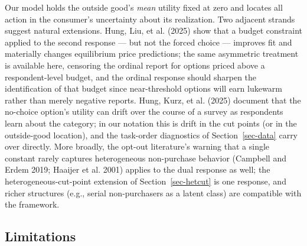 \documentclass[
  letterpaper,
  DIV=11,
  numbers=noendperiod]{scrartcl}
\theoremstyle{plain}
\theoremstyle{plain}
\theoremstyle{remark}
\begin{document}
Our model holds the outside good's \emph{mean} utility fixed at zero and
locates all action in the consumer's uncertainty about its realization.
Two adjacent strands suggest natural extensions. Hung, Liu, et al.
(2025) show that a budget constraint applied to the second response ---
but not the forced choice --- improves fit and materially changes
equilibrium price predictions; the same asymmetric treatment is
available here, censoring the ordinal report for options priced above a
respondent-level budget, and the ordinal response should sharpen the
identification of that budget since near-threshold options will earn
lukewarm rather than merely negative reports. Hung, Kurz, et al. (2025)
document that the no-choice option's utility can drift over the course
of a survey as respondents learn about the category; in our notation
this is drift in the cut points (or in the outside-good location), and
the task-order diagnostics of Section~\ref{sec-data} carry over
directly. More broadly, the opt-out literature's warning that a single
constant rarely captures heterogeneous non-purchase behavior (Campbell
and Erdem 2019; Haaijer et al. 2001) applies to the dual response as
well; the heterogeneous-cut-point extension of Section~\ref{sec-hetcut}
is one response, and richer structures (e.g., serial non-purchasers as a
latent class) are compatible with the framework.

\subsection{Limitations}\label{limitations}
\end{document}
